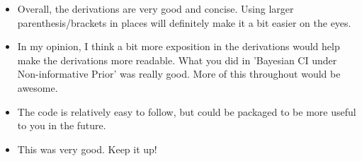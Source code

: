 \documentclass[10pt]{article}
\begin{document}
    \begin{itemize}

      \item Overall, the derivations are very good and concise. Using larger parenthesis/brackets in places will definitely make it a bit easier on the eyes.

      \item In my opinion, I think a bit more exposition in the derivations would help make the derivations more readable. What you did in 'Bayesian CI under Non-informative Prior' was really good. More of this throughout would be awesome.

      \item The code is relatively easy to follow, but could be packaged to be more useful to you in the future. 

      \item This was very good. Keep it up!

    \end{itemize}
\end{document}
